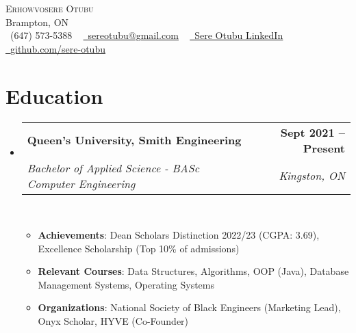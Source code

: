 \documentclass[letterpaper,11pt]{article}
\makeatletter
\newcommand{\resumeItem}[1]{
  \item\small{
    {#1 \vspace{-2pt}}
  }
}
\newcommand{\resumeSubheading}[4]{
  \vspace{-2pt}\item
    \begin{tabular*}{1.0\textwidth}[t]{l@{\extracolsep{\fill}}r}
      \textbf{#1} & \textbf{\small #2} \\
      \textit{\small#3} & \textit{\small #4} \\
    \end{tabular*}\vspace{-7pt}
}
\newcommand{\resumeSubHeadingListStart}{\begin{itemize}[leftmargin=0.0in, label={}]}
\newcommand{\resumeSubHeadingListEnd}{\end{itemize}}
\newcommand{\resumeItemListStart}{\begin{itemize}}
\newcommand{\resumeItemListEnd}{\end{itemize}\vspace{-5pt}}
\makeatother
\begin{document}

\begin{center}
    {\Huge \scshape Erhowvosere Otubu} \\ \vspace{1pt}
    Brampton, ON \\ \vspace{1pt}
    \small \raisebox{-0.1\height}\faPhone\ (647) 573-5388 ~ \href{mailto:youremail@email.com}{\raisebox{-0.2\height}\faEnvelope\  \underline{sereotubu@gmail.com}} ~ 
    \href{https://www.linkedin.com/in/sere-otubu-9782b1251/}{\raisebox{-0.2\height}\faLinkedin\ \underline{Sere Otubu LinkedIn}}  ~
    \href{https://github.com/sere-otubu}{\raisebox{-0.2\height}\faGithub\ \underline{github.com/sere-otubu}}
    \vspace{-8pt}
\end{center}

\section{Education}
  \resumeSubHeadingListStart
    \resumeSubheading
      {Queen's University, Smith Engineering}{Sept 2021 -- Present}
      {Bachelor of Applied Science - BASc Computer Engineering}{Kingston, ON}\
      \resumeItemListStart
      \resumeItem{\textbf{Achievements}: Dean Scholars Distinction  2022/23 (CGPA: 3.69), Excellence Scholarship (Top 10\% of admissions)}
      \resumeItem{\textbf{Relevant Courses}: Data Structures, Algorithms, OOP (Java), Database Management Systems, Operating Systems}
      \resumeItem{\textbf{Organizations}: National Society of Black Engineers (Marketing Lead), Onyx Scholar, HYVE (Co-Founder)}
      \resumeItemListEnd
  \resumeSubHeadingListEnd

\end{document}
